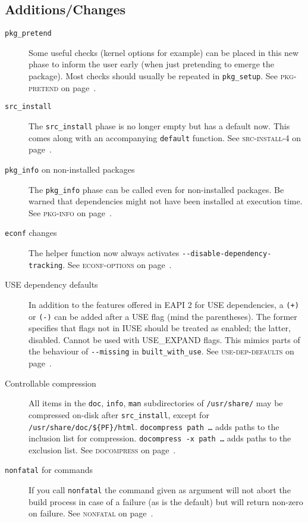 \documentclass[a4paper,nofoldmark]{leaflet}
\newcommand{\code}[1]{\texttt{#1}}
\newcommand{\featureref}[1]{\textsc{#1} on page~\pageref{feat:#1}}
\begin{document}
\subsection{Additions/Changes}
\label{sec:cs:eapi4-additions}
\begin{description}
    \item[\code{pkg\_pretend}] Some useful checks (kernel options for
    example) can be placed in this new phase to inform the user early
    (when just pretending to emerge the package).  Most checks should
    usually be repeated in \code{pkg\_setup}.
    See \featureref{pkg-pretend}.
    \item[\code{src\_install}] The \code{src\_install} phase is no
    longer empty but has a default now.  This comes along with an
    accompanying \code{default} function.
    See \featureref{src-install-4}.
    \item[\code{pkg\_info} on non-installed packages] The
    \code{pkg\_info} phase can be called even for non-installed
    packages.  Be warned that dependencies might not have been
    installed at execution time.  See \featureref{pkg-info}.
    \item[\code{econf} changes] The helper function now always
    activates \code{-{}-disable-dependency-tracking}.
    See \featureref{econf-options}.
    \item[USE dependency defaults] In addition to the features offered
    in EAPI 2 for USE dependencies, a \code{(+)} or \code{(-)} can be
    added after a USE flag (mind the parentheses).  The former
    specifies that flags not in IUSE should be treated as enabled; the
    latter, disabled. Cannot be used with USE\_EXPAND flags.  This
    mimics parts of the behaviour of \code{-{}-missing} in
    \code{built\_with\_use}.  See \featureref{use-dep-defaults}.
    \item[Controllable compression] All items in the \code{doc},
    \code{info}, \code{man} subdirectories of \code{/usr/share/} may
    be compressed on-disk after \code{src\_install}, except for
    \code{/usr/share/doc/\$\{PF\}/html}.  \code{docompress path \dots}
    adds paths to the inclusion list for compression.
    \code{docompress -x path \dots} adds paths to the exclusion list.
    See \featureref{docompress}.
    \item[\code{nonfatal} for commands] If you call \code{nonfatal}
    the command given as argument will not abort the build process in
    case of a failure (as is the default) but will return non-zero on
    failure.
    See \featureref{nonfatal}.

\end{description}
\end{document}
